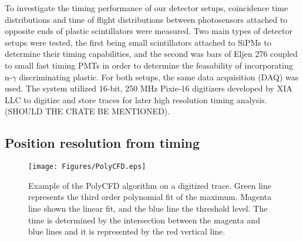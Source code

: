 To  investigate the timing performance of our detector setups, coincidence time distributions and time of flight distributions between photosensors attached to opposite ends of plastic scintillators were measured. Two main types of detector setups were tested, the first being small scintillators attached to SiPMs to determine their timing capabilities, and the second was bars of Eljen 276 coupled to small fast timing PMTs in order to determine the feasability of incorporating n-$\gamma$  discriminating plastic. For both setups, the same data acquisition (DAQ) was used. The system utilized 16-bit, 250 MHz Pixie-16 digitizers developed by XIA LLC to digitize and store traces for later high resolution timing analysis. \cite{XIA} (SHOULD THE CRATE BE MENTIONED).



\subsection{Position resolution from timing}
\begin{figure}[hbt]
\centering
\texttt{[image: Figures/PolyCFD.eps]}
\caption{Example of the PolyCFD algorithm on a digitized trace. Green line represents the third order polynomial fit of the maximum. Magenta line shown the linear fit, and the blue line the threshold level. The time is determined by the intersection between the magenta and blue lines and it is represented by the red vertical line.}
\label{fig:PolyCFD}
\end{figure}


